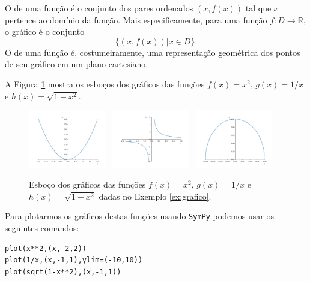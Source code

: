 O  de uma função é o conjunto dos pares ordenados $(x, f(x))$ tal que $x$ pertence ao domínio da função. Mais especificamente, para uma função $f:D\to \mathbb{R}$, o gráfico é o conjunto
\begin{equation}
  \{(x, f(x))| x\in D\}.
\end{equation}
O  de uma função é, costumeiramente, uma representação geométrica dos pontos de seu gráfico em um plano cartesiano.

\begin{ex}\label{ex:grafico}
  A Figura \ref{fig:ex_grafico} mostra os esboços dos gráficos das funções $f(x)=x^2$, $g(x)=1/x$ e $h(x)=\sqrt{1-x^2}$.
  
  \begin{figure}[H]
    \centering
    \includegraphics[width=0.3\textwidth]{./cap_funcao/dados/fig_ex_grafico/fig_ex_grafico_x2}~
    \includegraphics[width=0.3\textwidth]{./cap_funcao/dados/fig_ex_grafico/fig_ex_grafico_1x}~
    \includegraphics[width=0.3\textwidth]{./cap_funcao/dados/fig_ex_grafico/fig_ex_grafico_s1x2}
    \caption{Esboço dos gráficos das funções $f(x)=x^2$, $g(x)=1/x$ e $h(x)=\sqrt{1-x^2}$ dadas no Exemplo \ref{ex:grafico}.}
    \label{fig:ex_grafico}
  \end{figure}

  \ifispython
  Para plotarmos os gráficos destas funções usando \verb+SymPy+ podemos usar os seguintes comandos:
\begin{verbatim}
plot(x**2,(x,-2,2))
plot(1/x,(x,-1,1),ylim=(-10,10))
plot(sqrt(1-x**2),(x,-1,1))
\end{verbatim}
  \fi
\end{ex}

